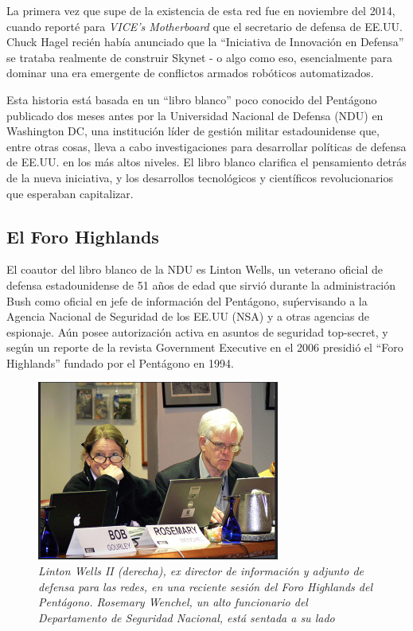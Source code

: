 \documentclass[10pt,a5paper,twoside,spanish,]{book}
\begin{document}
La primera vez que supe de la existencia de esta red fue en noviembre
del 2014, cuando reporté para \emph{VICE's Motherboard} que el
secretario de defensa de EE.UU. Chuck Hagel recién había anunciado que
la ``Iniciativa de Innovación en Defensa'' se trataba realmente de
construir Skynet - o algo como eso, esencialmente para dominar una era
emergente de conflictos armados robóticos automatizados.

Esta historia está basada en un ``libro blanco'' poco conocido del
Pentágono publicado dos meses antes por la Universidad Nacional de
Defensa (NDU) en Washington DC, una institución líder de gestión militar
estadounidense que, entre otras cosas, lleva a cabo investigaciones para
desarrollar políticas de defensa de EE.UU. en los más altos niveles. El
libro blanco clarifica el pensamiento detrás de la nueva iniciativa, y
los desarrollos tecnológicos y científicos revolucionarios que esperaban
capitalizar.

\subsection{El Foro Highlands}\label{el-foro-highlands}

El coautor del libro blanco de la NDU es Linton Wells, un veterano
oficial de defensa estadounidense de 51 años de edad que sirvió durante
la administración Bush como oficial en jefe de información del
Pentágono, suṕervisando a la Agencia Nacional de Seguridad de los EE.UU
(NSA) y a otras agencias de espionaje. Aún posee autorización activa en
asuntos de seguridad top-secret, y según un reporte de la revista
Government Executive en el 2006 presidió el ``Foro Highlands'' fundado
por el Pentágono en 1994.

\begin{figure}[htbp]
\centering
\includegraphics{1.1.png}
\caption{\emph{Linton Wells II (derecha), ex director de información y
adjunto de defensa para las redes, en una reciente sesión del Foro
Highlands del Pentágono. Rosemary Wenchel, un alto funcionario del
Departamento de Seguridad Nacional, está sentada a su lado}}
\end{figure}
\end{document}
